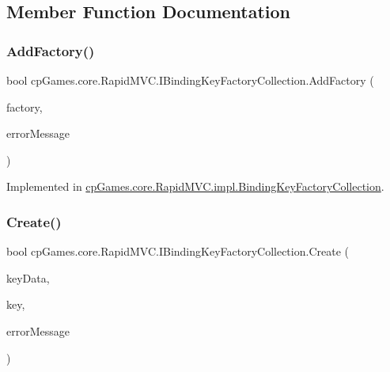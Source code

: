 \subsection{Member Function Documentation}
\mbox{\label{interfacecp_games_1_1core_1_1_rapid_m_v_c_1_1_i_binding_key_factory_collection_aa7aace3ebec361b82a563258ddda2213}} 
\subsubsection{\texorpdfstring{AddFactory()}{AddFactory()}}
{\footnotesize\ttfamily bool cp\+Games.\+core.\+Rapid\+M\+V\+C.\+I\+Binding\+Key\+Factory\+Collection.\+Add\+Factory (\begin{DoxyParamCaption}\item[{\mbox{\hyperlink{interfacecp_games_1_1core_1_1_rapid_m_v_c_1_1_i_binding_key_factory}{I\+Binding\+Key\+Factory}}}]{factory,  }\item[{out string}]{error\+Message }\end{DoxyParamCaption})}



Implemented in \mbox{\hyperlink{classcp_games_1_1core_1_1_rapid_m_v_c_1_1impl_1_1_binding_key_factory_collection_a401eb3e5efc28299218f217695a40718}{cp\+Games.\+core.\+Rapid\+M\+V\+C.\+impl.\+Binding\+Key\+Factory\+Collection}}.

\mbox{\label{interfacecp_games_1_1core_1_1_rapid_m_v_c_1_1_i_binding_key_factory_collection_a0e768b4fdf7855f5b5f9b7ac0c1865c8}} 
\subsubsection{\texorpdfstring{Create()}{Create()}}
{\footnotesize\ttfamily bool cp\+Games.\+core.\+Rapid\+M\+V\+C.\+I\+Binding\+Key\+Factory\+Collection.\+Create (\begin{DoxyParamCaption}\item[{object}]{key\+Data,  }\item[{out \mbox{\hyperlink{interfacecp_games_1_1core_1_1_rapid_m_v_c_1_1_i_binding_key}{I\+Binding\+Key}}}]{key,  }\item[{out string}]{error\+Message }\end{DoxyParamCaption})}



